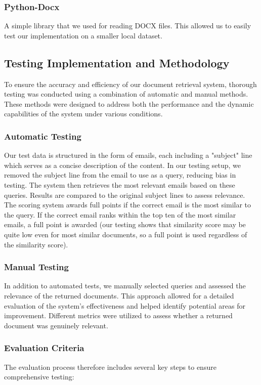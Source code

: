 \documentclass[12pt,a4paper]{article}
\begin{document}
        \bigskip
        \subsubsection{Python-Docx}

        \noindent
        A simple library that we used for reading DOCX files. This allowed us to easily test our implementation on a smaller local dataset.

\subsection{Testing Implementation and Methodology}
To ensure the accuracy and efficiency of our document retrieval system, thorough testing was conducted using a combination of automatic and manual methods. These methods were designed to address both the performance and the dynamic capabilities of the system under various conditions.

\subsubsection{Automatic Testing}
\noindent
Our test data is structured in the form of emails, each including a "subject" line which serves as a concise description of the content. In our testing setup, we removed the subject line from the email to use as a query, reducing bias in testing. The system then retrieves the most relevant emails based on these queries. Results are compared to the original subject lines to assess relevance. The scoring system awards full points if the correct email is the most similar to the query. If the correct email ranks within the top ten of the most similar emails, a full point is awarded (our testing shows that similarity score may be quite low even for most similar documents, so a full point is used regardless of the similarity score).

\subsubsection{Manual Testing}
\noindent
In addition to automated tests, we manually selected queries and assessed the relevance of the returned documents. This approach allowed for a detailed evaluation of the system's effectiveness and helped identify potential areas for improvement. Different metrics were utilized to assess whether a returned document was genuinely relevant.

\subsubsection{Evaluation Criteria}
The evaluation process therefore includes several key steps to ensure comprehensive testing:
\end{document}
